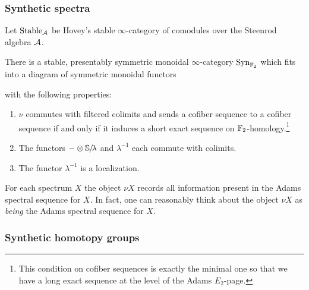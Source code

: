\subsubsection{Synthetic spectra}\hfill

Let $\mathrm{Stable}_{\operatorname{\mathcal{A}}}$ be Hovey's stable $\infty$-category of comodules \cite{Hovey} over the Steenrod algebra $\operatorname{\mathcal{A}}$.

\begin{cnstr}\label{cnstr:syn}
  There is a stable, presentably symmetric monoidal $\infty$-category $\mathrm{Syn}_{\operatorname{\mathbb{F}}_2}$
  which fits into a diagram of symmetric monoidal functors
  \begin{center}
  \end{center}
  with the following properties:
  \begin{enumerate}
  \item $\nu$ commutes with filtered colimits and sends a cofiber sequence to a cofiber sequence if and only if it induces a short exact sequence on $\operatorname{\mathbb{F}}_2$-homology.\footnote{This condition on cofiber sequences is exactly the minimal one so that we have a long exact sequence at the level of the Adams $E_2$-page.}
  \item The functors $- \otimes \operatorname{\mathbb{S}}\hspace{-2.2pt}/\!\lambda$ and $\lambda^{-1}$ each commute with colimits.%
  \item The functor $\lambda^{-1}$ is a localization. 
  \end{enumerate}  
\end{cnstr}
  
For each spectrum $X$ the object $\nu X$ records all information present in the Adams spectral sequence for $X$. In fact, one can reasonably think about the object $\nu X$ as \emph{being} the Adams spectral sequence for $X$.

\subsubsection{Synthetic homotopy groups}\hfill
 
